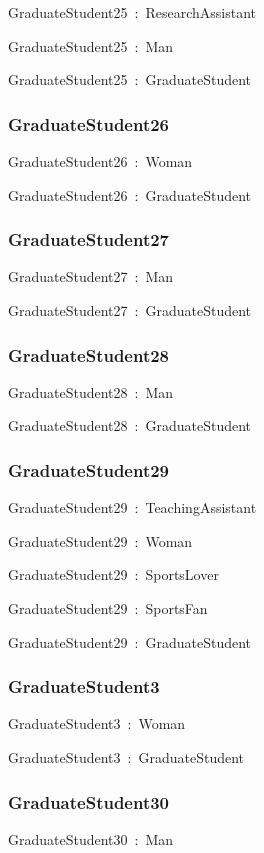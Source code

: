 \documentclass{article}
\begin{document}
GraduateStudent25~:~ResearchAssistant

GraduateStudent25~:~Man

GraduateStudent25~:~GraduateStudent

\subsubsection*{GraduateStudent26}

GraduateStudent26~:~Woman

GraduateStudent26~:~GraduateStudent

\subsubsection*{GraduateStudent27}

GraduateStudent27~:~Man

GraduateStudent27~:~GraduateStudent

\subsubsection*{GraduateStudent28}

GraduateStudent28~:~Man

GraduateStudent28~:~GraduateStudent

\subsubsection*{GraduateStudent29}

GraduateStudent29~:~TeachingAssistant

GraduateStudent29~:~Woman

GraduateStudent29~:~SportsLover

GraduateStudent29~:~SportsFan

GraduateStudent29~:~GraduateStudent

\subsubsection*{GraduateStudent3}

GraduateStudent3~:~Woman

GraduateStudent3~:~GraduateStudent

\subsubsection*{GraduateStudent30}

GraduateStudent30~:~Man
\end{document}
